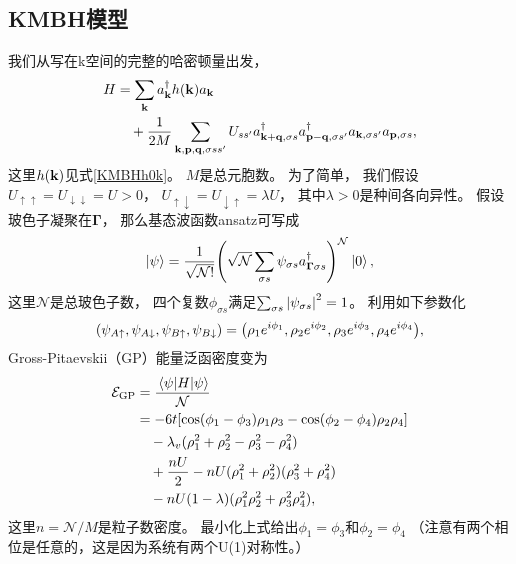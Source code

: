 \subsection{KMBH模型}
我们从写在k空间的完整的哈密顿量出发，
\begin{equation}\label{KMBHfullh}
\begin{split}
		H&=\sum_{\vb k}a^\dagger_{\vb k}h(\vb k)a_{\vb k}\\
	&\quad +\frac{1}{2M}\sum_{\vb k,\vb p,\vb q,\sigma ss'}U_{ss'} a^\dagger_{\vb k+\vb q,\sigma s}a^\dagger_{\vb p-\vb q,\sigma s'}a_{\vb k,\sigma s'}a_{\vb p,\sigma s},
\end{split}
\end{equation}
这里$h(\vb k)$见式\eqref{KMBHh0k}。
$M$是总元胞数。
为了简单，
我们假设$U_{\uparrow\uparrow}=U_{\downarrow\downarrow}=U>0$，
$U_{\uparrow\downarrow}=U_{\downarrow\uparrow}=\lambda U$，
其中$\lambda>0$是种间各向异性。
假设玻色子凝聚在$\boldsymbol{\Gamma}$，
那么基态波函数ansatz可写成
\begin{equation}
	\ket{\psi}=\frac{1}{\sqrt{\mathcal N!}}\pqty{\sqrt{\mathcal N}\sum_{\sigma s}\psi_{\sigma s}a_{\boldsymbol{\Gamma}\sigma s}^\dagger}^{\mathcal N}\ket{0},\nonumber
\end{equation}
这里$\mathcal N$是总玻色子数，
四个复数$\phi_{\sigma s}$满足$\sum_{\sigma s}\abs{\psi_{\sigma s}}^2=1$。
利用如下参数化
\begin{equation}\label{parametrization}
	\pqty{\psi_{A\uparrow},\psi_{A\downarrow},\psi_{B\uparrow},\psi_{B\downarrow}}=\pqty{\rho_1 e^{i \phi_1},\rho_2 e^{i \phi_2},\rho_3 e^{i \phi_3},\rho_4 e^{i \phi_4}},
\end{equation}
Gross-Pitaevskii（GP）能量泛函密度变为
\begin{equation}\label{hmf}
\begin{split}
	\mathcal E_{\textnormal{GP}} &= \frac{\mel{\psi}{H}{\psi}}{\mathcal N}\\
	 &= -6t[\cos(\phi_1-\phi_3) \rho_1 \rho_3-\cos(\phi_2-\phi_4) \rho_2 \rho_4]\\
	 &\quad - \lambda_v (\rho_1^2+\rho_2^2-\rho_3^2-\rho_4^2)\\
	&\quad + \frac{nU}{2} - nU(\rho_1^2+\rho_2^2)(\rho_3^2+\rho_4^2)\\
	&\quad - nU(1-\lambda)(\rho_1^2 \rho_2^2 + \rho_3^2 \rho_4^2),
\end{split}
\end{equation}
这里$n=\mathcal N/M$是粒子数密度。
最小化上式给出$\phi_1=\phi_3$和$\phi_2=\phi_4$
（注意有两个相位是任意的，这是因为系统有两个U(1)对称性。）
